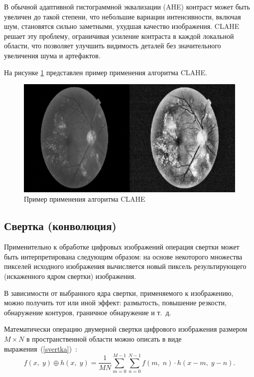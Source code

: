 В обычной адаптивной гистограммной эквализации (AHE) контраст может быть увеличен до такой степени, что небольшие вариации интенсивности, включая шум, становятся сильно заметными, ухудшая качество изображения. CLAHE решает эту проблему, ограничивая усиление контраста в каждой локальной области, что позволяет улучшить видимость деталей без значительного увеличения шума и артефактов.

На рисунке \ref{clahe-example} представлен пример применения алгоритма CLAHE.

\begin{figure}[H]
    \centering
    \includegraphics[scale=0.95]{assets/clahe-example}
    \caption{Пример применения алгоритма CLAHE}
    \label{clahe-example}
\end{figure}

\subsection{Свертка (конволюция)}

Применительно к обработке цифровых изображений операция свертки может быть интерпретирована следующим образом: на основе некоторого множества пикселей исходного изображения вычисляется новый пиксель результирующего (искаженного ядром свертки) изображения.

В зависимости от выбранного ядра свертки, применяемого к изображению, можно получить тот или иной эффект: размытость, повышение резкости, обнаружение контуров, граничное обнаружение и т.~д.

Математически операцию двумерной свертки цифрового изображения размером $M \times N$ в пространственной области можно описать в виде выражения~(\ref{svertka})~\cite{svertka}: 
\begin{equation}\label{svertka}
	f(x,\;y) \oplus h(x,\;y) = \frac{1}{MN}\sum_{m=0}^{M-1}\sum_{n=0}^{N-1} f(m,\;n) \cdot h(x - m,\;y - n).
\end{equation}

